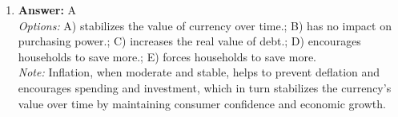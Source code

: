 \documentclass[12pt]{article}
\begin{document}
\begin{enumerate}[label=\arabic*.]
\\ \textit{Note:} The correct answer is rooted in the principle that capitalism allows individuals to make their own choices regarding production, consumption, and investment, thereby fostering a sense of personal autonomy and freedom that is not as prevalent in other economic systems.
\item \textbf{Answer:} A
\\ \textit{Options:} A) stabilizes the value of currency over time.; B) has no impact on purchasing power.; C) increases the real value of debt.; D) encourages households to save more.; E) forces households to save more.
\\ \textit{Note:} Inflation, when moderate and stable, helps to prevent deflation and encourages spending and investment, which in turn stabilizes the currency's value over time by maintaining consumer confidence and economic growth.
\end{enumerate}
\end{document}
